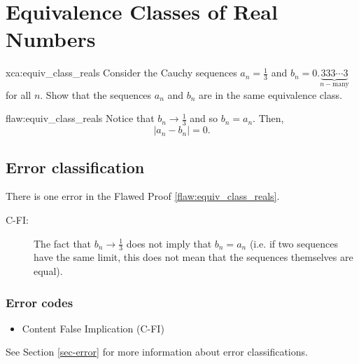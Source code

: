 
\section{Equivalence Classes of Real Numbers}

\begin{xca}{xca:equiv_class_reals}
Consider the Cauchy sequences $a_n = \frac{1}{3}$ and $b_n = 0.\underbrace{333\cdots3}_{n-\text{many}}$ for all $n$. Show that the sequences $a_n$ and $b_n$ are in the same equivalence class.
\end{xca}

\begin{flaw}{flaw:equiv_class_reals} %
Notice that $b_n \rightarrow \frac{1}{3}$ and so $b_n = a_n.$ Then,
$$| a_n - b_n | = 0.$$
\end{flaw}

\clearpage
\subsection{Error classification}


There is one error
 in the Flawed Proof \ref{flaw:equiv_class_reals}. %


 \begin{description}
	\item[C-FI:] The fact that $b_n \rightarrow \frac{1}{3}$ does not imply that $b_n = a_n$ (i.e. if two sequences have the same limit, this does not mean that the sequences themselves are equal).
 \end{description}


\subsubsection{Error codes}
\begin{itemize}
	\item 	Content False Implication (C-FI)
\end{itemize}
See Section \ref{sec-error} for more information about error classifications.

